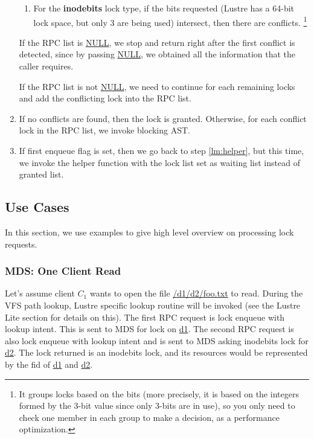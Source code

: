 \begin{enumerate}
\begin{enumerate}
  \item For the \textbf{inodebits} lock type, if the bits requested (Lustre has a
	64-bit lock space, but only 3 are being used) intersect, then there are
	conflicts.  \footnote{It groups locks based on the bits (more precisely, it is
	based on the integers formed by the 3-bit value since only 3-bits are in use),
	so you only need to check one member in each group to make a decision, as a
	performance optimization.}

  \end{enumerate}

If the RPC list is \url{NULL}, we stop and return right after the first
conflict is detected, since by passing \url{NULL}, we obtained all the
information that the caller requires. 

If the RPC list is not \url{NULL}, we need to continue for each remaining locks
and add the conflicting lock into the RPC list.


\item If no conflicts are found, then the lock is granted. Otherwise, for each
conflict lock in the RPC list, we invoke blocking AST.


\item If first enqueue flag is set, then we go back to step \ref{lm:helper},
but this time, we invoke the helper function with the lock list set as waiting list
instead of granted list.


\end{enumerate}


\subsection{Use Cases}

In this section, we use examples to give high level overview on
processing lock requests.

\subsubsection*{MDS: One Client Read}

Let's assume client $C_1$ wants to open the file \url{/d1/d2/foo.txt} to read.
During the VFS path lookup, Lustre specific lookup routine will be invoked (see the
Lustre Lite section for details on this). The first RPC request is lock enqueue
with lookup intent. This is sent to MDS for lock on \url{d1}. The second RPC
request is also lock enqueue with lookup intent and is sent to MDS asking
inodebits lock for \url{d2}. The lock returned is an inodebits lock, and its
resources would be represented by the fid of \url{d1} and \url{d2}.

